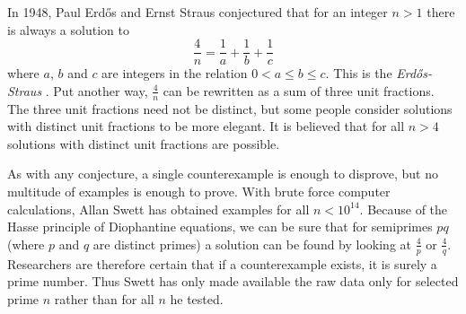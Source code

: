 \documentclass[12pt]{article}
\begin{document}
In 1948, Paul Erd\H{o}s and Ernst Straus conjectured that for an integer $n > 1$ there is always a solution to $$\frac{4}{n} = \frac{1}{a} + \frac{1}{b} + \frac{1}{c}$$ where $a$, $b$ and $c$ are integers in the relation $0 < a \le b \le c$. This is the {\em Erd\H{o}s-Straus }. Put another way, $\frac{4}{n}$ can be rewritten as a sum of three unit fractions. The three unit fractions need not be distinct, but some people consider solutions with distinct unit fractions to be more elegant. It is believed that for all $n > 4$ solutions with distinct unit fractions are possible.

As with any conjecture, a single counterexample is enough to disprove, but no multitude of examples is enough to prove. With brute force computer calculations, Allan Swett has obtained examples for all $n < 10^{14}$. Because of the Hasse principle of Diophantine equations, we can be sure that for semiprimes $pq$ (where $p$ and $q$ are distinct primes) a solution can be found by looking at $\frac{4}{p}$ or $\frac{4}{q}$. Researchers are therefore certain that if a counterexample exists, it is surely a prime number. Thus Swett has only made available the raw data only for selected prime $n$ rather than for all $n$ he tested.
\end{document}
